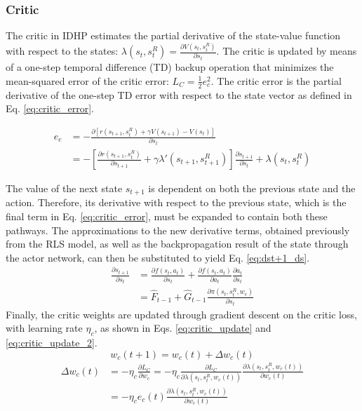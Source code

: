 \subsubsection{Critic}
The critic in IDHP estimates the partial derivative of the state-value function with respect to the states: $\lambda(s_t, s^R_t) = \frac{\partial V(s_t, s^R_t)}{\partial s_t}$. The critic is updated by means of a one-step temporal difference (TD) backup operation that minimizes the mean-squared error of the critic error: $L_C = \frac{1}{2}e_c^2$. The critic error is the partial derivative of the one-step TD error with respect to the state vector as defined in Eq. \eqref{eq:critic_error}. 

\begin{equation} \label{eq:critic_error}
    \begin{split}
        e_c &= -\frac{\partial \left[ r(s_{t+1}, s^R_t) + \gamma V(s_{t+1}) - V(s_t) \right]}{ \partial s_t} \\
        &= -\left[\frac{\partial r(s_{t+1}, s^R_t)}{ \partial s_{t+1}} + \gamma \lambda'(s_{t+1}, s^R_{t+1})\right] \frac{\partial s_{t+1}}{\partial s_t } + \lambda(s_{t}, s^R_t)
    \end{split}
\end{equation}

The value of the next state $s_{t+1}$ is dependent on both the previous state and the action. Therefore, its derivative with respect to the previous state, which is the final term in Eq. \eqref{eq:critic_error}, must be expanded to contain both these pathways. The approximations to the new derivative terms, obtained previously from the RLS model, as well as the backpropagation result of the state through the actor network, can then be substituted to yield Eq. \eqref{eq:dst+1_ds}. 
\begin{equation} \label{eq:dst+1_ds}
\begin{split}
    \frac{\partial s_{t+1}}{\partial s_t } &= \frac{\partial f(s_t, a_t)}{\partial s_t } + \frac{\partial f(s_t, a_t)}{\partial a_t } \frac{\partial a_t}{\partial s_t} \\
    &= \hat{F}_{t-1} + \hat{G}_{t-1} \frac{\partial \pi(s_t, s^R_t, w_c)}{\partial s_t}
\end{split}
\end{equation}
Finally, the critic weights are updated through gradient descent on the critic loss, with learning rate $\eta_c$, as shown in Eqs. \eqref{eq:critic_update} and \eqref{eq:critic_update_2}.
\begin{equation} \label{eq:critic_update}
    w_c(t+1) = w_c(t) + \Delta w_c(t)
\end{equation}
\begin{equation} \label{eq:critic_update_2}
\begin{split}
    \Delta w_c(t) &= -\eta_c \frac{\partial L_C}{\partial w_c } =  -\eta_c \frac{\partial L_C}{\partial \lambda(s_{t}, s^R_t, w_c(t))} \frac{\partial \lambda(s_{t}, s^R_t, w_c(t))}{\partial w_c(t)} \\
    &= -\eta_c e_c(t) \frac{\partial \lambda(s_{t}, s^R_t, w_c(t))}{\partial w_c(t)}
\end{split}
\end{equation}

